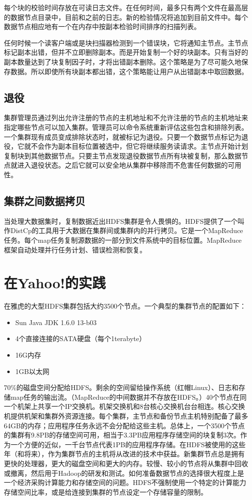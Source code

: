 每个块的校验时间存放在可读日志文件。在任何时间，最多只有两个文件在最高层的数据节点目录中，目前和之前的日志。新的检验情况将追加到目前文件中。每个数据节点相应地有一个在内存中按副本检验时间排序的扫描列表。

任何时候一个读客户端或是块扫描器检测到一个错误块，它将通知主节点。主节点标记副本出错，但并不立即删除副本。而是开始复制一个好的块副本。只有当好的副本数量达到了块复制因子时，才将出错副本删除。这个策略是为了尽可能久地保存数据。所以即使所有块副本都出错，这个策略能让用户从出错副本中取回数据。

\subsection{退役}
集群管理员通过列出允许注册的节点的主机地址和不允许注册的节点的主机地址来指定哪些节点可以加入集群。管理员可以命令系统重新评估这些包含和排除列表。一个集群现有成员变成排除状态时，就被标记为退役。只要一个数据节点标记为退役，它就不会作为副本目标位置被选中，但它将继续服务读请求。主节点开始计划复制块到其他数据节点。只要主节点发现退役数据节点所有块被复制，那么数据节点就进入退役状态。之后它就可以安全地从集群中移除而不危害任何数据的可用性。

\subsection{集群之间数据拷贝}

当处理大数据集时，复制数据近出HDFS集群是令人畏惧的。HDFS提供了一个叫作DistCp的工具用于大数据在集群间或集群内的并行拷贝。它是一个MapReduce任务。每个map任务复制源数据的一部分到文件系统中的目标位置。MapReduce框架自动处理并行任务计划、错误检测和恢复。

\section{在Yahoo!的实践}

在雅虎的大型HDFS集群包括大约3500个节点。一个典型的集群节点的配置如下：
\begin{itemize}
,频率2.5ghz
5.1版
\item Sun Java JDK 1.6.0 13-b03
\item4个直接连接的SATA硬盘（每个1terabyte）
\item16G内存
\item1GB以太网
\end{itemize}

70\%的磁盘空间分配给HDFS。剩余的空间留给操作系统（红帽Linux）、日志和存储map任务的输出流。（MapReduce的中间数据并不存放在HDFS。）40个节点在同一个机架上共享一个IP交换机。机架交换机和8台核心交换机台台相连。核心交换机提供机架和集群外资源连接。每个集群，主节点和备份节点主机特别配备了最多64GB的内存；应用程序任务永远不会分配给这些主机。总体上，一个3500个节点的集群有9.8PB的存储空间可用，相当于3.3PB应用程序存储空间的块复制3次。作为一个方便的近似，一千台节点代表1PB的应用程序存储。在HDFS被使用的这些年（和将来），作为集群节点的主机将从改进的技术中获益。新集群节点总是拥有更快的处理器，更大的磁盘空间和更大的内存。较慢、较小的节点将从集群中回收或撤离，然后用于Hadoop的研发和测试。如何准备数据节点的选择很大程度上是一个经济采购计算能力和存储空间的问题。HDFS不强制使用一个特定的计算能力存储空间比率，或是给连接到集群的节点设定一个存储容量的限制。

